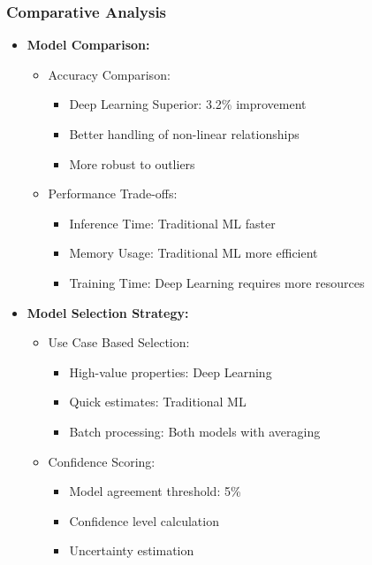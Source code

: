 \documentclass[12pt,a4paper]{report}
\begin{document}
\subsubsection{Comparative Analysis}
\begin{itemize}
    \item \textbf{Model Comparison:}
    \begin{itemize}
        \item Accuracy Comparison:
        \begin{itemize}
            \item Deep Learning Superior: 3.2\% improvement
            \item Better handling of non-linear relationships
            \item More robust to outliers
        \end{itemize}
        
        \item Performance Trade-offs:
        \begin{itemize}
            \item Inference Time: Traditional ML faster
            \item Memory Usage: Traditional ML more efficient
            \item Training Time: Deep Learning requires more resources
        \end{itemize}
    \end{itemize}
    
    \item \textbf{Model Selection Strategy:}
    \begin{itemize}
        \item Use Case Based Selection:
        \begin{itemize}
            \item High-value properties: Deep Learning
            \item Quick estimates: Traditional ML
            \item Batch processing: Both models with averaging
        \end{itemize}
        
        \item Confidence Scoring:
        \begin{itemize}
            \item Model agreement threshold: 5\%
            \item Confidence level calculation
            \item Uncertainty estimation
        \end{itemize}
    \end{itemize}
\end{itemize}
\end{document}
